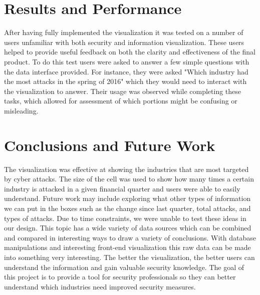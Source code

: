 \documentclass[journal]{vgtc}                %
\begin{document}
\section{Results and Performance}
After having fully implemented the visualization it was tested on a number of users unfamiliar with both security and information visualization. 
These users helped to provide useful feedback on both the clarity and effectiveness of the final product. 
To do this test users were asked to answer a few simple questions with the data interface provided.
For instance, they were asked "Which industry had the most attacks in the spring of 2016" which they would need to interact with the visualization to answer.
Their usage was observed while completing these tasks, which allowed for assessment of which portions might be confusing or misleading.


\section{Conclusions and Future Work}
The visualization was effective at showing the industries that are most targeted by cyber attacks. 
The size of the cell was used to show how many times a certain industry is attacked in a given financial quarter and users were able to easily understand.
Future work may include exploring what other types of information we can put in the boxes such as the change since last quarter, total attacks, and types of attacks. 
Due to time constraints, we were unable to test these ideas in our design.
This topic has a wide variety of data sources which can be combined and compared in interesting ways to draw a variety of conclusions.
With database manipulations and interesting front-end visualization this raw data can be made into something very interesting.
The better the visualization, the better users can understand the information and gain valuable security knowledge.
The goal of this project is to provide a tool for security professionals so they can better understand which industries need improved security measures. 

%

%
%
%


\end{document}
